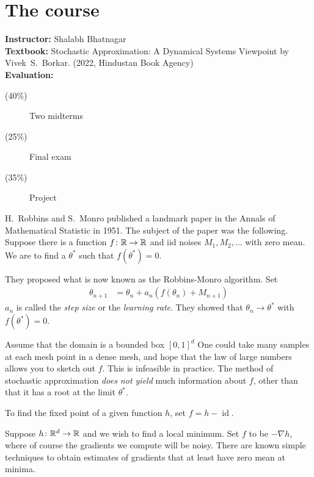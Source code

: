 \chapter*{The course}

\textbf{Instructor:} Shalabh Bhatnagar
\\[1em]
\textbf{Textbook:} Stochastic Approximation: A Dynamical Systems Viewpoint
by Vivek~S.~Borkar. (2022, Hindustan Book Agency)
\\[1em]
\textbf{Evaluation:}
\begin{description}
    \item[(40\%)] Two midterms
    \item[(25\%)] Final exam
    \item[(35\%)] Project
\end{description}

H.~Robbins and S.~Monro published a landmark paper in the Annals of
Mathematical Statistic in 1951.
The subject of the paper was the following.
Suppose there is a function $f\colon \mathbb{R} \to \mathbb{R}$ and iid noises
$M_1, M_2, \dots$ with zero mean.
We are to find a $\theta^*$ such that $f(\theta^*) = 0$.

They proposed what is now known as the Robbins-Monro algorithm.
Set \begin{align*}
    \theta_{n+1} &= \theta_n + a_n (f(\theta_n) + M_{n+1})
\end{align*}
$a_n$ is called the \emph{step size} or the \emph{learning rate}.
They showed that $\theta_n \to \theta^*$ with $f(\theta^*) = 0$.

Assume that the domain is a bounded box $[0, 1]^d$
One could take many samples at each mesh point in a dense mesh, and hope
that the law of large numbers allows you to sketch out $f$.
This is infeasible in practice.
The method of stochastic approximation \emph{does not yield} much
information about $f$, other than that it has a root at the limit
$\theta^*$.

\begin{examples}
    \item To find the fixed point of a given function $h$,
        set $f = h - \operatorname{id}$.
    \item Suppose $h\colon \mathbb{R}^d \to \mathbb{R}$ and we wish to find a local minimum.
        Set $f$ to be $-\nabla h$, where of course the gradients we compute
        will be noisy.
        There are known simple techniques to obtain estimates of gradients
        that at least have zero mean at minima.
\end{examples}

